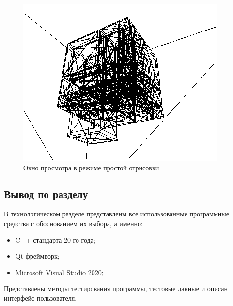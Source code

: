 \begin{figure}[ht]
	\centering
	\includegraphics[width=0.7\linewidth]{img/scene_carcass}
	\caption{Окно просмотра в режиме простой отрисовки}
	\label{fig:scenecarcass}
\end{figure}

\subsection{Вывод по разделу}
В технологическом разделе представлены все использованные программные средства с обоснованием их выбора, а именно:
\begin{itemize}
	\item C++ стандарта 20-го года;
	\item Qt фреймворк;
	\item Microsoft Visual Studio 2020;
\end{itemize}

Представлены методы тестирования программы, тестовые данные и описан интерфейс пользователя.

